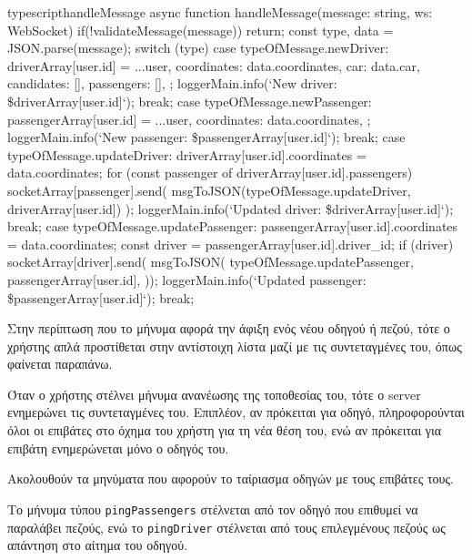 \documentclass[../thesis.tex]{subfiles}
\begin{document}
\begin{codeblock}{typescript}{handleMessage}
  async function handleMessage(message: string, ws: WebSocket) {
    if(!validateMessage(message)) return;
    const { type, data } = JSON.parse(message);
    switch (type) {
      case typeOfMessage.newDriver: {
        driverArray[user.id] = {
          ...user,
          coordinates: data.coordinates,
          car: data.car,
          candidates: [],
          passengers: [],
        };
        loggerMain.info(`New driver: \${driverArray[user.id]}`);
        break;
      }
      case typeOfMessage.newPassenger: {
        passengerArray[user.id] = {
          ...user,
          coordinates: data.coordinates,
        };
        loggerMain.info(`New passenger: \${passengerArray[user.id]}`);
        break;
      }
    }
    case typeOfMessage.updateDriver: {
      driverArray[user.id].coordinates = data.coordinates;
      for (const passenger of driverArray[user.id].passengers) {
        socketArray[passenger].send(
          msgToJSON(typeOfMessage.updateDriver, driverArray[user.id])
        );
      }
      loggerMain.info(`Updated driver: \${driverArray[user.id]}`);
      break;
    }
    case typeOfMessage.updatePassenger: {
      passengerArray[user.id].coordinates = data.coordinates;
      const driver = passengerArray[user.id].driver_id;
      if (driver) {
        socketArray[driver].send(
          msgToJSON(
            typeOfMessage.updatePassenger,
            passengerArray[user.id],
        ));
      }
      loggerMain.info(`Updated passenger: \${passengerArray[user.id]}`);
      break;
    }
  }
\end{codeblock}

Στην περίπτωση που το μήνυμα αφορά την άφιξη ενός νέου οδηγού ή πεζού, τότε ο χρήστης απλά προστίθεται στην αντίστοιχη λίστα μαζί με τις συντεταγμένες του, όπως φαίνεται παραπάνω.

Όταν ο χρήστης στέλνει μήνυμα ανανέωσης της τοποθεσίας του, τότε ο server ενημερώνει τις συντεταγμένες του.
Επιπλέον, αν πρόκειται για οδηγό, πληροφορούνται όλοι οι επιβάτες στο όχημα του χρήστη για τη νέα θέση του, ενώ αν πρόκειται για επιβάτη ενημερώνεται μόνο ο οδηγός του.

\bigskip

Ακολουθούν τα μηνύματα που αφορούν το ταίριασμα οδηγών με τους επιβάτες τους.

Το μήνυμα τύπου \texttt{pingPassengers} στέλνεται από τον οδηγό που επιθυμεί να παραλάβει πεζούς, ενώ το \texttt{pingDriver} στέλνεται από τους επιλεγμένους πεζούς ως απάντηση στο αίτημα του οδηγού.
\end{document}
